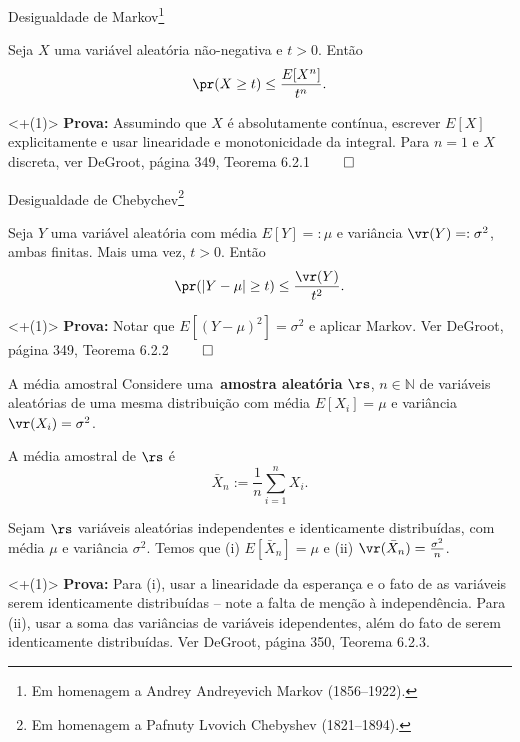 \begin{frame}{Desigualdade de Markov\footnote{Em homenagem a Andrey Andreyevich Markov (1856–1922).}}
\begin{theo}
 \label{them:Markov_ineq}
 Seja $X$ uma variável aleatória não-negativa e $t > 0$.
Então
\begin{equation}
 \label{eq:Markov_ineq}
 \pr(X \geq t) \leq \frac{E[X^n]}{t^n}.
\end{equation}
\end{theo}
\uncover<+(1)>{
\textbf{Prova:} Assumindo que $X$ é absolutamente contínua, escrever $E[X]$ explicitamente e usar linearidade e monotonicidade da integral.
Para $n = 1$ e $X$ discreta, ver DeGroot, página 349, Teorema 6.2.1 $\qed$
}
\end{frame}
\begin{frame}{Desigualdade de Chebychev\footnote{Em homenagem a Pafnuty Lvovich Chebyshev (1821--1894).}}
\begin{theo}
 \label{thm:Chebychev_ineq}
 Seja $Y$ uma variável aleatória com média $E[Y] =: \mu$ e variância $\vr(Y) =: \sigma^2$, ambas finitas.
Mais uma vez, $t>0$.
Então
\begin{equation}
 \label{eq:Chebychev_ineq}
 \pr(|Y-\mu| \geq t) \leq \frac{\vr(Y)}{t^2}.
\end{equation}
\end{theo}
\uncover<+(1)>{
\textbf{Prova:} Notar que $E[(Y-\mu)^2] = \sigma^2$ e aplicar Markov.
Ver DeGroot, página 349, Teorema 6.2.2 $\qed$
}
\end{frame}
\begin{frame}{A média amostral}
Considere uma~\textbf{amostra aleatória} $\rs$, $n \in \mathbb{N}$ de variáveis aleatórias de uma mesma distribuição com média $E[X_i] = \mu$ e variância $\vr(X_i) = \sigma^2$.
\begin{defn}
 A média amostral de $\rs$ é
 \begin{equation}
  \label{eq:sample_mean}
  \bar{X}_n := \frac{1}{n} \sum_{i = 1}^n X_i.
 \end{equation}
\end{defn}

\begin{theo}
\label{thm:iid_properties}
Sejam  $\rs$ variáveis aleatórias independentes e identicamente distribuídas, com média $\mu$ e variância $\sigma^2$.
Temos que (i) $E[\bar{X}_n] = \mu$ e (ii) $\vr(\bar{X}_n) = \frac{\sigma^2}{n}$.
\end{theo}
\uncover<+(1)>{
\textbf{Prova:} Para (i), usar a linearidade da esperança e o fato de as variáveis serem identicamente distribuídas -- note a falta de menção à independência.
Para (ii), usar a soma das variâncias de variáveis idependentes, além do fato de serem identicamente distribuídas.
Ver DeGroot, página 350, Teorema 6.2.3.
}
\end{frame}
